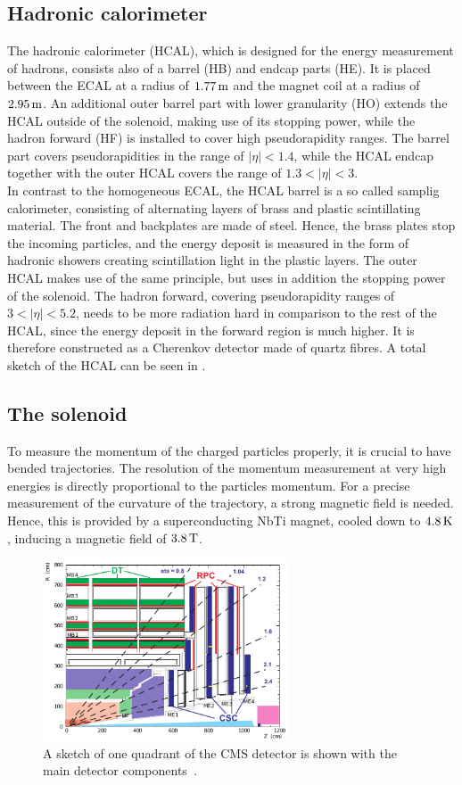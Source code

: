 \subsection{Hadronic calorimeter}
The hadronic calorimeter (HCAL), which is designed for the energy measurement of hadrons, consists also of a barrel (HB) and endcap parts (HE). It is placed between the ECAL at a radius of $1.77\,\text{m}$ and the magnet coil at a radius of $2.95\,\text{m}$. An additional outer barrel part with lower granularity (HO) extends the HCAL outside of the solenoid, making use of its stopping power, while the hadron forward (HF) is installed to cover high pseudorapidity ranges. The barrel part covers pseudorapidities in the range of $|\eta|<1.4$, while the HCAL endcap together with the outer HCAL covers the range of $1.3<|\eta|<3$.\\
In contrast to the homogeneous ECAL, the HCAL barrel is a so called samplig calorimeter, consisting of alternating layers of brass and plastic scintillating material. The front and backplates are made of steel. Hence, the brass plates stop the incoming particles, and the energy deposit is measured in the form of hadronic showers creating scintillation light in the plastic layers. The outer HCAL makes use of the same principle, but uses in addition the stopping power of the solenoid. The hadron forward, covering pseudorapidity ranges of $3<|\eta|<5.2$, needs to be more radiation hard in comparison to the rest of the HCAL, since the energy deposit in the forward region is much higher. It is therefore constructed as a Cherenkov detector made of quartz fibres. A total sketch of the HCAL can be seen in .

\subsection{The solenoid}
To measure the momentum of the  charged particles properly, it is crucial to have bended trajectories. The resolution of the momentum measurement at very high energies is directly proportional to the particles momentum. For a precise measurement of the curvature of the trajectory, a strong magnetic field is needed. Hence, this is provided by a superconducting NbTi magnet, cooled down to $4.8\,\text{K}$, inducing a magnetic field of $3.8\,\text{T}$.

\begin{figure}[tbp]
 \centering
 \includegraphics[width=0.65\textwidth]{figures/general/muonChamber}
 \caption{A sketch of one quadrant of the CMS detector is shown with the main detector components~\cite{CMSTDR}.}
 \label{fig:etaPlaneCMSTotal}
\end{figure}

